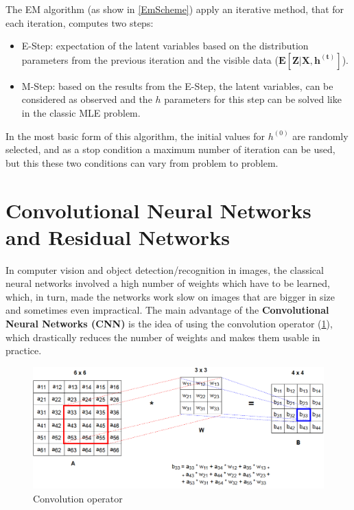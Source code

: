  The EM algorithm (as show in \ref{EmScheme}) apply an iterative method, that for each iteration, computes two steps:
 \begin{itemize}
 	\item E-Step: expectation of the latent variables based on the distribution parameters from the previous iteration and the visible data ($\mathbf{E[Z | X, h^{(t)}]}$).
 	\item M-Step: based on the results from the E-Step, the latent variables, can be considered as observed and the $h$ parameters for this step can be solved like in the classic MLE problem.
 \end{itemize}

In the most basic form of this algorithm, the initial values for $h^{(0)}$ are randomly selected, and as a stop condition a maximum number of iteration can be used, but this these two conditions can vary from problem to problem.
 
 
 

\section{Convolutional Neural Networks and Residual Networks}
In computer vision and object detection/recognition in images, the classical neural networks involved a high number of weights which have to be learned, which, in turn, made the networks work slow on images that are bigger in size and sometimes even impractical. The main advantage of the \textbf{Convolutional Neural Networks (CNN)} is the idea of using the convolution operator (\ref{Convolution}), which drastically reduces the number of weights and makes them usable in practice.

 \begin{figure}[H]
	\includegraphics[width=\textwidth]{Pictures/006Convolution.png}
	\caption{Convolution operator}
	\label{Convolution}
\end{figure}

